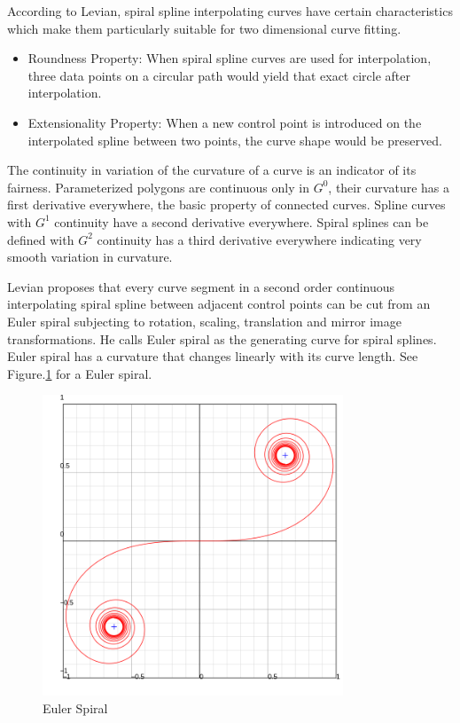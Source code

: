 \documentclass[10pt]{article}
\begin{document}
According to Levian, spiral spline interpolating curves have certain characteristics which make them particularly suitable for two dimensional curve fitting.
\begin{itemize}
	
	\item Roundness Property:  When spiral spline curves are used for interpolation, three data points on a circular path would yield that exact circle after interpolation.
	\item Extensionality Property: When a new control point is introduced on the interpolated spline between two points, the curve shape would be preserved.
\end{itemize}

The continuity in variation of the curvature of a curve is an indicator of its fairness. Parameterized polygons are continuous only in $G^0$, their curvature has a first derivative everywhere, the basic property of connected curves. Spline curves with $G^1$ continuity have a second derivative everywhere. Spiral splines can be defined with $G^2$ continuity has a third derivative everywhere indicating very smooth variation in curvature. 
 
 Levian proposes that every curve segment in a second order continuous interpolating spiral spline between adjacent control points can be cut from an Euler spiral subjecting to rotation, scaling, translation and mirror image transformations. He calls Euler spiral as the generating curve for spiral splines. Euler spiral has a curvature that changes linearly with its curve length. See Figure.\ref{eulerspiral} for a Euler spiral.


\begin{figure}
	\centering
	\includegraphics[width=0.8\textwidth]{images/Euler_spiral.png}
	\caption{Euler Spiral}
	\label{eulerspiral}
\end{figure}
\end{document}
